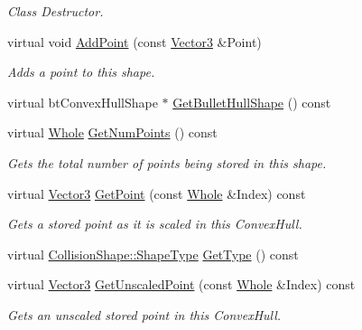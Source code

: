 \begin{DoxyCompactItemize}
\begin{DoxyCompactList}\small\item\em Class Destructor. \item\end{DoxyCompactList}\item 
virtual void \hyperlink{classMezzanine_1_1ConvexHullCollisionShape_a6e6f3da8515bfd2b1d33563e86f3ed1e}{AddPoint} (const \hyperlink{classMezzanine_1_1Vector3}{Vector3} \&Point)
\begin{DoxyCompactList}\small\item\em Adds a point to this shape. \item\end{DoxyCompactList}\item 
virtual btConvexHullShape $\ast$ \hyperlink{classMezzanine_1_1ConvexHullCollisionShape_a35acc9fd0c3e990bcacf1caf6d65a094}{GetBulletHullShape} () const 
\item 
virtual \hyperlink{namespaceMezzanine_adcbb6ce6d1eb4379d109e51171e2e493}{Whole} \hyperlink{classMezzanine_1_1ConvexHullCollisionShape_a8eaf9dccce90a9366d37ab9112bc0f22}{GetNumPoints} () const 
\begin{DoxyCompactList}\small\item\em Gets the total number of points being stored in this shape. \item\end{DoxyCompactList}\item 
virtual \hyperlink{classMezzanine_1_1Vector3}{Vector3} \hyperlink{classMezzanine_1_1ConvexHullCollisionShape_a7f769cdc76fb7c62060a28472277466d}{GetPoint} (const \hyperlink{namespaceMezzanine_adcbb6ce6d1eb4379d109e51171e2e493}{Whole} \&Index) const 
\begin{DoxyCompactList}\small\item\em Gets a stored point as it is scaled in this ConvexHull. \item\end{DoxyCompactList}\item 
virtual \hyperlink{classMezzanine_1_1CollisionShape_ad04186055565998879b64176d6dd100d}{CollisionShape::ShapeType} \hyperlink{classMezzanine_1_1ConvexHullCollisionShape_a73ccd6364f52a68a642a0fb55159f020}{GetType} () const 
\item 
virtual \hyperlink{classMezzanine_1_1Vector3}{Vector3} \hyperlink{classMezzanine_1_1ConvexHullCollisionShape_a28e1633a760562ceb8427c08232518d7}{GetUnscaledPoint} (const \hyperlink{namespaceMezzanine_adcbb6ce6d1eb4379d109e51171e2e493}{Whole} \&Index) const 
\begin{DoxyCompactList}\small\item\em Gets an unscaled stored point in this ConvexHull. \item\end{DoxyCompactList}\item 

\end{DoxyCompactItemize}
